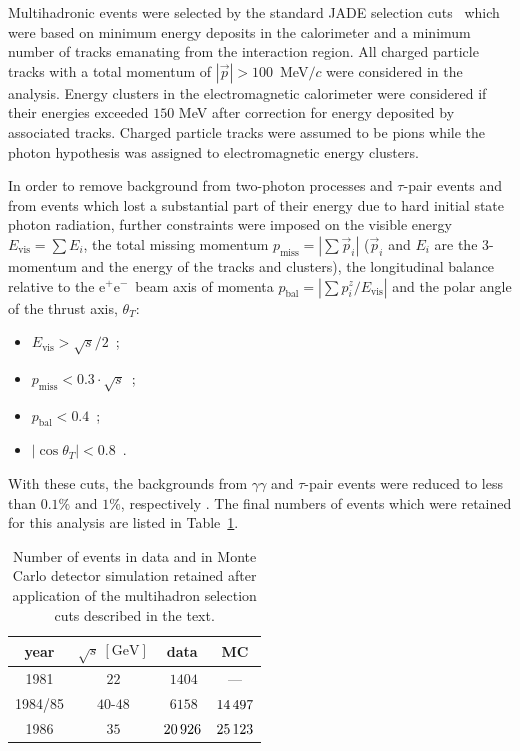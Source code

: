 \documentclass[12pt,a4paper,twoside]{article}
\newcommand{\epem}   {\ensuremath{\mathrm{e^+e^-}}}
\begin{document}
Multihadronic events were selected by the standard JADE selection 
cuts~\cite{bib-JADEtrigger} which were based on
minimum energy deposits 
in the calorimeter and a minimum number of tracks emanating
from the interaction region.
All charged particle tracks with a total momentum of $|\vec{p}| >
100$~MeV$/c$ were considered in the analysis. Energy clusters in the
electromagnetic calorimeter were considered if their energies
exceeded $150$ MeV after correction for 
energy deposited by associated tracks.  
Charged particle tracks were assumed to be pions 
while the photon hypothesis was assigned to electromagnetic
energy clusters.

In order to remove background from two-photon processes and 
$\tau$-pair events and from events which lost a substantial part of
their energy due to hard initial state photon radiation,
further constraints were imposed on the visible energy 
$E_{\mathrm{vis}} = \sum E_i$, 
the total missing momentum
$p_{\mathrm{miss}} = |\sum \vec{p}_i|$ ($\vec{p}_i$ and $E_i$
are the 3-momentum and the energy of the tracks and clusters), 
the longitudinal balance relative to the \epem\ beam axis of momenta 
$p_{\mathrm{bal}} = |\sum p^z_i/E_{\mathrm{vis}}|$
and the polar angle of the
thrust axis, $\theta_{T}$:
\begin{itemize}
\item $E_{\mathrm{vis}} > \sqrt{s}/2$~;
\item $p_{\mathrm{miss}} < 0.3\cdot \sqrt{s}$~;
\item $p_{\mathrm{bal}} < 0.4$~;
\item $|\cos\theta_{T}| < 0.8$~.
\end{itemize}
With these cuts, the backgrounds from 
$\gamma\gamma$ and $\tau$-pair events were reduced to less than 
$0.1\%$ and $1\%$, respectively \cite{bib-JADEeventsel}.
The final numbers of events which were retained for this analysis
are listed in Table~\ref{tab-eventnumbers}.

\begin{table}[b]
\begin{center}
\begin{tabular}{|c|c||c|c|}
\hline
year & $\sqrt{s}\ [\mathrm{GeV}]$ & data & MC \\ 
\hline\hline
   1981 &  $22$      &             $\ 1404$ &               ---   \\ \hline
1984/85 &  $40$-$48$ &             $\ 6158$ & $14\thinspace 497$  \\ \hline
   1986 &  $35$      &   $20\thinspace 926$ & $25\thinspace 123$  \\
\hline
\end{tabular}
\end{center}
\caption{\label{tab-eventnumbers}
Number of events in data and in Monte Carlo detector simulation retained after 
application of the multihadron selection cuts described in the text. 
}
\end{table}
\end{document}
